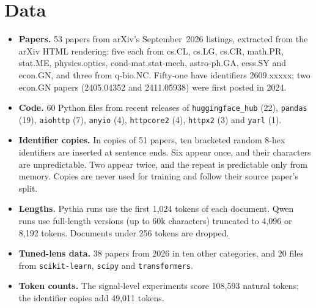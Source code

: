 \documentclass[11pt]{article}
\begin{document}
\section{Data}\label{app:data}
\begin{itemize}
\item \textbf{Papers.} 53 papers from arXiv's September~2026 listings, extracted from the arXiv HTML rendering: five each from cs.CL, cs.LG, cs.CR, math.PR, stat.ME, physics.optics, cond-mat.stat-mech, astro-ph.GA, eess.SY and econ.GN, and three from q-bio.NC. Fifty-one have identifiers 2609.xxxxx; two econ.GN papers (2405.04352 and 2411.05938) were first posted in 2024.
\item \textbf{Code.} 60 Python files from recent releases of \texttt{huggingface\_hub} (22), \texttt{pandas} (19), \texttt{aiohttp} (7), \texttt{anyio} (4), \texttt{httpcore2} (4), \texttt{httpx2} (3) and \texttt{yarl} (1).
\item \textbf{Identifier copies.} In copies of 51 papers, ten bracketed random 8-hex identifiers are inserted at sentence ends. Six appear once, and their characters are unpredictable. Two appear twice, and the repeat is predictable only from memory. Copies are never used for training and follow their source paper's split.
\item \textbf{Lengths.} Pythia runs use the first 1,024 tokens of each document. Qwen runs use full-length versions (up to 60k characters) truncated to 4,096 or 8,192 tokens. Documents under 256 tokens are dropped.
\item \textbf{Tuned-lens data.} 38 papers from 2026 in ten other categories, and 20 files from \texttt{scikit-learn}, \texttt{scipy} and \texttt{transformers}.
\item \textbf{Token counts.} The signal-level experiments score 108,593 natural tokens; the identifier copies add 49,011 tokens.
\end{itemize}
\end{document}
